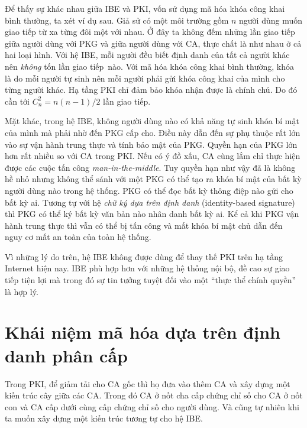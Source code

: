 \documentclass[class=report, crop=false]{standalone}
\begin{document}
		Để thấy sự khác nhau giữa IBE và PKI, vốn sử dụng mã hóa khóa công khai bình thường, ta xét ví dụ sau. Giả sử có một môi trường gồm $n$ người dùng muốn giao tiếp từ xa từng đôi một với nhau. Ở đây ta không đếm những lần giao tiếp giữa người dùng với PKG và giữa người dùng với CA, thực chất là như nhau ở cả hai loại hình. Với hệ IBE, mỗi người đều biết định danh của tất cả người khác nên \emph{không} tốn lần giao tiếp~nào. Với mã hóa khóa công khai bình thường, khóa là do mỗi người tự sinh nên mỗi người phải gửi khóa công khai của mình cho từng người khác. Hạ tầng PKI chỉ đảm bảo khóa nhận được là chính chủ. Do đó cần tới $C_n^2 = n(n-1)/2$ lần giao tiếp.

		Mặt khác, trong hệ IBE, không người dùng nào có khả năng tự sinh khóa bí mật của mình mà phải nhờ đến PKG cấp cho. Điều này dẫn đến sự phụ thuộc rất lớn vào sự vận hành trung thực và tính bảo mật của PKG. Quyền hạn của PKG lớn hơn rất nhiều so với CA trong PKI. Nếu có ý đồ xấu, CA cùng lắm chỉ thực hiện được các cuộc tấn công \textit{man-in-the-middle}. Tuy quyền hạn như vậy đã là không hề nhỏ nhưng không thể sánh với một PKG có thể tạo ra khóa bí mật của bất kỳ người dùng nào trong hệ thống. PKG có thể đọc bất kỳ thông điệp nào gửi cho bất kỳ ai. Tương tự với hệ \textit{chữ ký dựa trên định danh} (identity-based signature) thì PKG có thể ký bất kỳ văn bản nào nhân danh bất kỳ ai. Kể cả khi PKG vận hành trung thực thì vẫn có thể bị tấn công và mất khóa bí mật chủ dẫn đến nguy cơ mất an toàn của toàn hệ thống.

		Vì những lý do trên, hệ IBE không được dùng để thay thế PKI trên hạ tầng Internet hiện nay. IBE phù hợp hơn với những hệ thống nội bộ, đề cao sự giao tiếp tiện lợi mà trong đó sự tin tưởng tuyệt đối vào một ``thực thể chính quyền'' là hợp lý.
	\section{Khái niệm mã hóa dựa trên định danh phân cấp}
		Trong PKI, để giảm tải cho CA gốc thì họ đưa vào thêm CA và xây dựng một kiến trúc cây giữa các CA. Trong đó CA ở nốt cha cấp chứng chỉ số cho CA ở nốt con và CA cấp dưới cùng cấp chứng chỉ số cho người dùng. Và cũng tự nhiên khi ta muốn xây dựng một kiến trúc tương tự cho hệ IBE.
\end{document}
